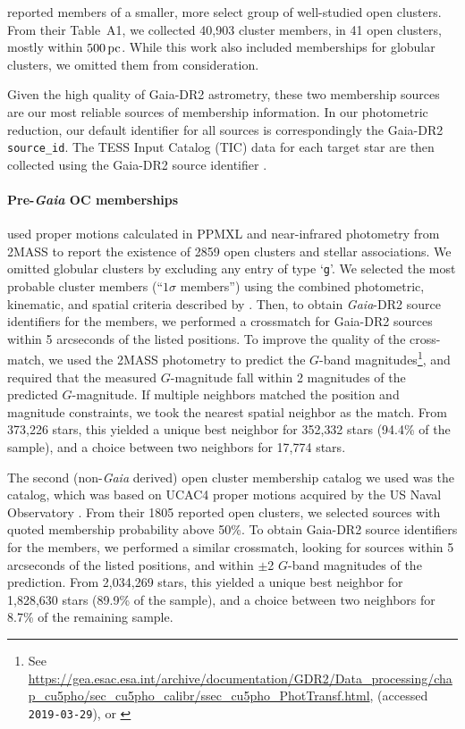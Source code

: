 \documentclass[12pt,twocolumn,tighten]{aastex62}
\begin{document}
\citet{gaia_hr_2018} reported members of a smaller, more select group
of well-studied open clusters. From their Table~A1, we collected
40{,}903 cluster members, in 41 open clusters, mostly within
$500\,{\rm pc}$. While this work also included memberships for
globular clusters, we omitted them from consideration.

Given the high quality of Gaia-DR2 astrometry, these two membership
sources are our most reliable sources of membership information.  In
our photometric reduction,  our default identifier for all sources is
correspondingly the Gaia-DR2 \texttt{source\_id}.  The TESS Input
Catalog (TIC) data for each target star are then collected using the
Gaia-DR2 source identifier \citep{stassun_TIC_2018,stassun_TIC8_2019}.  

\paragraph{Pre-{\it Gaia} OC memberships}

\citet{Kharchenko_et_al_2013} used proper motions calculated in PPMXL
\citep[][a combination of USNO-B1{.}0 and 2MASS
astrometry]{roeser_ppmxl_2010} and near-infrared photometry from 2MASS
\citep{skrutskie_tmass_2006} to report the existence of 2859 open
clusters and stellar associations. We omitted globular clusters by
excluding any entry of type `\texttt{g}'.  We selected the most
probable cluster members (``$1\sigma$ members'') using the combined
photometric, kinematic, and spatial criteria described by
\citet{kharchenko_global_2012}.  Then, to obtain {\it
Gaia}-DR2 source identifiers for the members, we performed a
crossmatch for Gaia-DR2 sources within 5 arcseconds of the listed
positions.  To improve the quality of the cross-match, we used the
2MASS photometry to predict the $G$-band magnitudes\footnote{See
\url{https://gea.esac.esa.int/archive/documentation/GDR2/Data_processing/chap_cu5pho/sec_cu5pho_calibr/ssec_cu5pho_PhotTransf.html},
(accessed \texttt{2019-03-29}), or \citet{carrasco_gaia_2016}}, and
required that the measured $G$-magnitude fall within 2 magnitudes of
the predicted $G$-magnitude.  If multiple neighbors matched the
position and magnitude constraints, we took the nearest spatial
neighbor as the match.  From 373{,}226 stars, this yielded a unique
best neighbor for 352{,}332 stars (94.4\% of the sample), and a choice
between two neighbors for 17{,}774 stars. 

The second (non-{\it Gaia} derived) open cluster membership catalog we
used was the \citet{dias_proper_2014} catalog, which was based on
UCAC4 proper motions acquired by the US Naval Observatory
\citep{zacharias_fourth_2013}.  From their 1805 reported open
clusters, we selected sources with quoted membership probability above
50\%.  To obtain Gaia-DR2 source identifiers for the members, we
performed a similar crossmatch, looking for sources within 5
arcseconds of the listed positions, and within $\pm$2 $G$-band
magnitudes of the prediction.  From 2{,}034{,}269 stars, this yielded
a unique best neighbor for 1{,}828{,}630 stars (89.9\% of the sample),
and a choice between two neighbors for 8.7\% of the remaining sample. 
\end{document}

